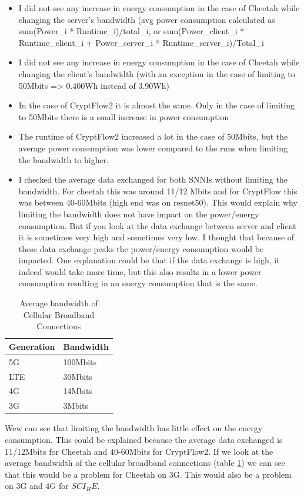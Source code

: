 \documentclass[../thesis.tex]{subfiles}
\begin{document}
\begin{itemize}
        \item I did not see any increase in energy consumption in the case of Cheetah while changing the server's bandwidth (avg power consumption calculated as sum(Power_i * Runtime_i)/total_i, or sum(Power_client_i * Runtime_client_i + Power_server_i * Runtime_server_i)/Total_i
        \item I did not see any increase in energy consumption in the case of Cheetah while changing the client's bandwidth (with an exception in the case of limiting to 50Mbits => 0.400Wh instead of 3.90Wh)
        \item In the case of CryptFlow2 it is almost the same. Only in the case of limiting to 50Mbits there is a small increase in power consumption
        \item The runtime of CryptFlow2 increased a lot in the case of 50Mbits, but the average power consumption was lower compared to the runs when limiting the bandwidth to higher.
        \item I checked the average data exchanged for both SNNIs without limiting the bandwidth. For cheetah this was around 11/12 Mbits and for CryptFlow this was between 40-60Mbits (high end was on resnet50). This would explain why limiting the bandwidth does not have impact on the power/energy consumption. But if you look at the data exchange between server and client it is sometimes very high and sometimes very low. I thought that because of these data exchange peaks the power/energy consumption would be impacted. One explanation could be that if the data exchange is high, it indeed would take more time, but this also results in a lower power consumption resulting in an energy consumption that is the same. 
\end{itemize}

\begin{table}[]
        \begin{tabular}{ll}
                Generation & Bandwidth \\ \hline
                5G         & 100Mbits  \\ \hline
                LTE        & 30Mbits   \\ \hline
                4G         & 14Mbits   \\ \hline
                3G         & 3Mbits   
        \end{tabular}
        \caption{Average bandwidth of Cellular Broadband Connections}
        \label{table:avg_bandwidth}
\end{table}
Wew can see that limiting the bandwidth has little effect on the energy consumption. This could be explained because the average data exchanged is 11/12Mbits for Cheetah and 40-60Mbits for CryptFlow2. If we look at the average bandwidth of the cellular broadband connections (table \ref{table:avg_bandwidth}) we can see that this would be a problem for Cheetah on 3G. This would also be a problem on 3G and 4G for $SCI_HE$.
\end{document}
